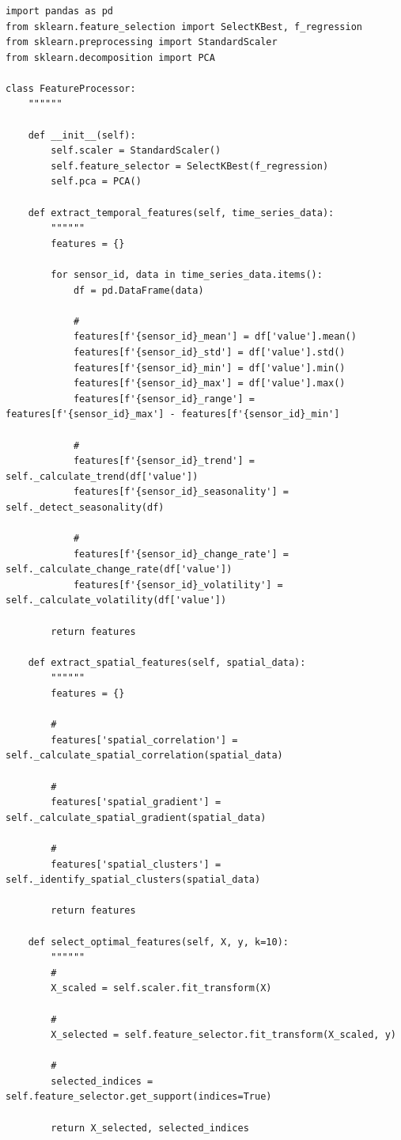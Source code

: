 \hypertarget{section-97}{%
\subsubsection{}\label{section-97}}

\begin{lstlisting}[style=python]
import pandas as pd
from sklearn.feature_selection import SelectKBest, f_regression
from sklearn.preprocessing import StandardScaler
from sklearn.decomposition import PCA

class FeatureProcessor:
    """"""
    
    def __init__(self):
        self.scaler = StandardScaler()
        self.feature_selector = SelectKBest(f_regression)
        self.pca = PCA()
        
    def extract_temporal_features(self, time_series_data):
        """"""
        features = {}
        
        for sensor_id, data in time_series_data.items():
            df = pd.DataFrame(data)
            
            # 
            features[f'{sensor_id}_mean'] = df['value'].mean()
            features[f'{sensor_id}_std'] = df['value'].std()
            features[f'{sensor_id}_min'] = df['value'].min()
            features[f'{sensor_id}_max'] = df['value'].max()
            features[f'{sensor_id}_range'] = features[f'{sensor_id}_max'] - features[f'{sensor_id}_min']
            
            # 
            features[f'{sensor_id}_trend'] = self._calculate_trend(df['value'])
            features[f'{sensor_id}_seasonality'] = self._detect_seasonality(df)
            
            # 
            features[f'{sensor_id}_change_rate'] = self._calculate_change_rate(df['value'])
            features[f'{sensor_id}_volatility'] = self._calculate_volatility(df['value'])
        
        return features
    
    def extract_spatial_features(self, spatial_data):
        """"""
        features = {}
        
        # 
        features['spatial_correlation'] = self._calculate_spatial_correlation(spatial_data)
        
        # 
        features['spatial_gradient'] = self._calculate_spatial_gradient(spatial_data)
        
        # 
        features['spatial_clusters'] = self._identify_spatial_clusters(spatial_data)
        
        return features
    
    def select_optimal_features(self, X, y, k=10):
        """"""
        # 
        X_scaled = self.scaler.fit_transform(X)
        
        # 
        X_selected = self.feature_selector.fit_transform(X_scaled, y)
        
        # 
        selected_indices = self.feature_selector.get_support(indices=True)
        
        return X_selected, selected_indices
\end{lstlisting}

